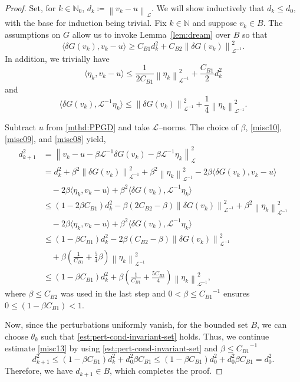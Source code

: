 \documentclass[10pt,a4paper]{amsart}
\newcommand{\CddB}{{C_{B2}}} %
\newcommand{\CdvB}{{C_{B1}}} %
\newcommand{\LL}{\mathcal{L}}
\newcommand{\LLinv}{{\mathcal{L}^{-1}}}
\newcommand{\dG}{{\delta G}}
\newcommand{\etak}{{\eta_{k}}}
\newcommand{\norm}[2]{\left\| #1 \right\| _{#2}}
\newcommand{\pairing}[2]{\bigl\langle #1 , #2 \bigr\rangle}
\newcommand{\polN}{\mathbb N}
\newcommand{\s}{{\beta}}	%
\newcommand{\vk}{{v_{k}}}
\begin{document}
	\begin{proof}
  Set, for $k \in \polN_0$, $d_k \coloneqq \norm{v_k - u}{\LL}$. We will show inductively that $d_k \leq d_0$, with the base for induction being trivial. Fix $k \in \polN$ and suppose $\vk\in B$. The assumptions on $G$ allow us to invoke Lemma~\ref{lem:dream} over $B$ so that
	\begin{equation}\label{misc10}
		\pairing{\dG(\vk)}{\vk-u} \ge \CdvB d_{k}^2 + \CddB \norm{\dG(\vk)}{\LLinv}^2.
	\end{equation}
	In addition, we trivially have
	\begin{equation}\label{misc09}
		\pairing{\etak}{\vk -u}
		\le	\frac{1}{2\CdvB} \norm{\etak}{\LLinv}^2+  \frac{\CdvB}{2}d_{k}^2
	\end{equation}
	and
	\begin{equation}\label{misc08}
		\pairing{\dG(\vk)}{\LLinv\etak}
		\le 
		\norm{\dG(\vk)}{\LLinv}^2+ \frac{1}{4} \norm{\etak}{\LLinv}^2.
	\end{equation}
	
	Subtract $u$ from \eqref{mthd:PPGD} and take $\LL$--norms. The choice of $\s$, \eqref{misc10}, \eqref{misc09}, and \eqref{misc08} yield,
	\begin{equation}
	\label{misc13}
	  \begin{aligned}
      d_{k+1}^2 &=\norm{\vk-u -\s\LLinv \delta G(\vk)-\s\LLinv\etak}{\LL}^2
      \\
      &= d_{k}^2 + \s^2\norm{\delta G(\vk)}{\LLinv}^2 + \s^2\norm{\etak}{\LLinv}^2 -2\s\pairing{\dG(\vk)}{\vk-u}
	\\
& \quad - 2\s\pairing{\etak}{\vk-u} +\s^2\pairing{\dG(\vk)}{\LLinv\etak}
      \\
      &\le (1-2\s \CdvB) d_{k}^2 - \s(2\CddB -\s)\norm{\delta G(\vk)}{\LLinv}^2 + \s^2\norm{\etak}{\LLinv}^2
	\\
& \quad - 2\s\pairing{\etak}{\vk-u} +\s^2\pairing{\dG(\vk)}{\LLinv\etak}
      \\
      &\le \left(1-\s\CdvB \right)d_{k}^2 - 2\s\left(\CddB -\s\right)\norm{\delta G(\vk)}{\LLinv}^2
	\\
& \quad +\s\left(\frac{1}{\CdvB} +\frac 5 4 \s\right)\norm{\etak}{\LLinv}^2
      \\
      &\le \left(1-\s\CdvB \right)d_{k}^2  + \s \left(\frac{1}{\CdvB} +\frac{5\CddB}{4} \right)\norm{\etak}{\LLinv}^2,
	  \end{aligned}
	\end{equation}
	where $\s \le \CddB$ was used in the last step and $0<\s \le \CdvB^{-1}$ ensures $0 \le \left(1-\s\CdvB \right) <1$.

	Now, since the perturbations uniformly vanish, for the bounded set $B$, we can choose $\theta_k$ such that \eqref{est:pert-cond-invariant-set} holds.
	Thus, we continue estimate \eqref{misc13} by using \eqref{est:pert-cond-invariant-set} and $\s \le \CdvB^{-1}$
	\[
		d_{k+1}^2 
		\le \left(1 - \s\CdvB \right) d_k^2 
		+
		d_0^2 \s\CdvB
		\le \left(1-\s\CdvB \right)d_0^2 +d_0^2 \s\CdvB
		= d_0^2.
	\]
	Therefore, we have $d_{k+1} \in B$, which completes the proof.
\end{proof}
\end{document}
